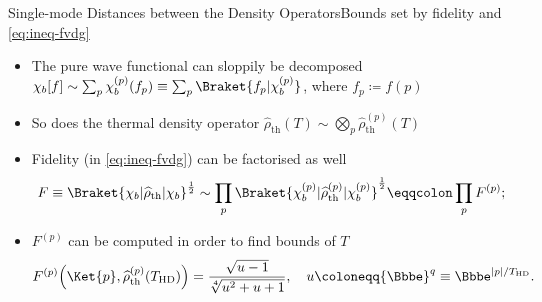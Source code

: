 \documentclass{beamer}
\newcommand{\ee}{{\Bbbe}}
\newcommand{\rbr}[1]{{\left(#1\right)}}
\newcommand{\vbr}[1]{{\left|#1\right|}}
\newcommand{\rfun}[2]{{#1}\mathopen{}\left(#2\right)\mathclose{}}
\newcommand{\sfun}[2]{{#1}\mathopen{}\left[#2\right]\mathclose{}}
\newcommand{\what}[1]{{\widehat{#1}}}
\begin{document}
\begin{frame}[allowframebreaks]{Single-mode Distances between the Density 
Operators}{Bounds set by fidelity and \cref{eq:ineq-fvdg}}

\begin{itemize}


\item The pure wave functional can sloppily be decomposed $\sfun{\chi_b}{f} 
\sim \sum_p \rfun{\chi_b^\rbr{p}}{f_p} \equiv \sum_p \Braket{f_p | 
\chi_b^{\rbr{p}}}$, where $f_p \coloneqq \rfun{f}{p}$

\item So does the thermal density operator $\rfun{\what{\rho}_\text{th}}{T} \sim
\bigotimes_p \rfun{\what{\rho}_\text{th}^\rbr{p}}{T}$

\item Fidelity (in \cref{eq:ineq-fvdg}) can be factorised as well
\begin{equation}
F \equiv \Braket{\chi_b | \what{\rho}_\text{th} | \chi_b}^\frac{1}{2} \sim
\prod_p \Braket{\chi_b^{\rbr{p}} | \what{\rho}_\text{th}^{\rbr{p}}
| \chi_b^{\rbr{p}}}^\frac{1}{2} \eqqcolon \prod_p F^{\rbr{p}};
\end{equation}
\item $F^{\rbr{p}}$ can be computed \alert{in order to find bounds of $T$}
\begin{equation}
\rfun{F^{\rbr{p}}}{\Ket{p},\rfun{\what{\rho}_\text{th}^\rbr{p}}{T_\text{HD}}}
= \frac{\sqrt{u-1}}{\sqrt[4]{u^2+u+1}},\quad
u \coloneqq \ee^q \equiv \ee^{\vbr{p}/T_\text{HD}}.
\label{eq:fidelity-pt}
\end{equation}
\end{itemize}

\begin{center}

\end{center}

\end{frame}
\end{document}
